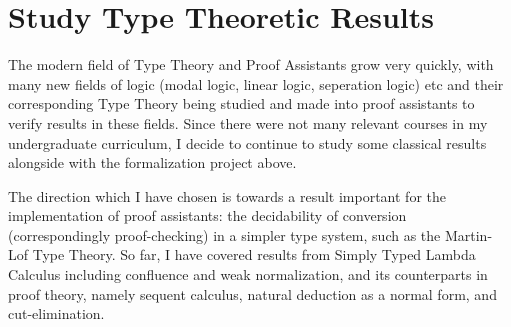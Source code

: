 \section{Study Type Theoretic Results}

The modern field of Type Theory and Proof Assistants grow very quickly, with
many new fields of logic (modal logic, linear logic, seperation logic) etc and
their corresponding Type Theory being studied and made into proof assistants to 
verify results in these fields. Since there were not many relevant courses in my 
undergraduate curriculum, I decide to continue to study some classical results
alongside with the formalization project above.

The direction which I have chosen is towards a result important for the
implementation of proof assistants: the decidability of conversion
(correspondingly proof-checking) in a simpler type system, such as the Martin-Lof
Type Theory. So far, I have covered results from Simply Typed Lambda Calculus
including confluence and weak normalization, and its counterparts in proof theory,
namely sequent calculus, natural deduction as a normal form, and cut-elimination.